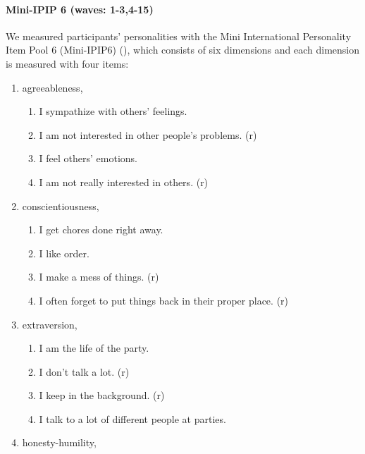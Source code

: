 \documentclass[
  single column]{article}
\let\oldparagraph\paragraph
\renewcommand{\paragraph}[1]{\oldparagraph{#1}\mbox{}}
\providecommand{\tightlist}{%
  \setlength{\itemsep}{0pt}\setlength{\parskip}{0pt}}\usepackage{longtable,booktabs,array}
\begin{document}
\paragraph{Mini-IPIP 6 (waves:
1-3,4-15)}\label{mini-ipip-6-waves-1-34-15}

We measured participants' personalities with the Mini International
Personality Item Pool 6 (Mini-IPIP6) (), which consists of six dimensions and each
dimension is measured with four items:

\begin{enumerate}
\def\labelenumi{\arabic{enumi}.}
\item
  agreeableness,

  \begin{enumerate}
  \def\labelenumii{\roman{enumii}.}
  \tightlist
  \item
    I sympathize with others' feelings.
  \item
    I am not interested in other people's problems. (r)
  \item
    I feel others' emotions.
  \item
    I am not really interested in others. (r)
  \end{enumerate}
\item
  conscientiousness,

  \begin{enumerate}
  \def\labelenumii{\roman{enumii}.}
  \tightlist
  \item
    I get chores done right away.
  \item
    I like order.
  \item
    I make a mess of things. (r)
  \item
    I often forget to put things back in their proper place. (r)
  \end{enumerate}
\item
  extraversion,

  \begin{enumerate}
  \def\labelenumii{\roman{enumii}.}
  \tightlist
  \item
    I am the life of the party.
  \item
    I don't talk a lot. (r)
  \item
    I keep in the background. (r)
  \item
    I talk to a lot of different people at parties.
  \end{enumerate}
\item
  honesty-humility,


\end{enumerate}
\end{document}
